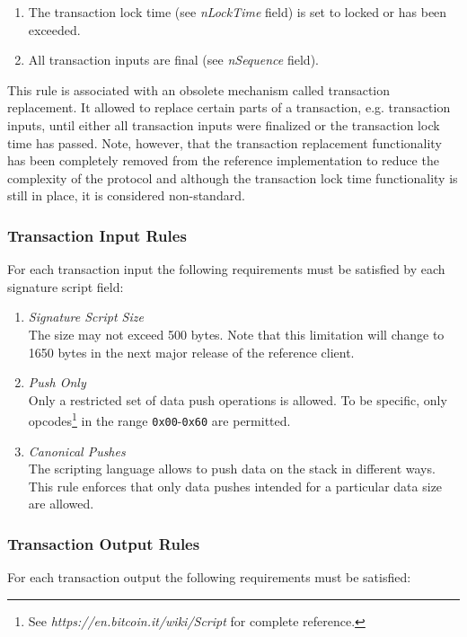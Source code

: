 \begin{enumerate}[label=\arabic*), leftmargin=1cm]
\item The transaction lock time (see \textit{nLockTime} field) is set to locked or has been exceeded.
\item All transaction inputs are final (see \textit{nSequence} field).
\end{enumerate}

\noindent
This rule is associated with an obsolete mechanism called transaction replacement. It allowed to replace certain parts of a transaction, e.g. transaction inputs, until either all transaction inputs were finalized or the transaction lock time has passed. Note, however, that the transaction replacement functionality has been completely removed from the reference implementation to reduce the complexity of the protocol and although the transaction lock time functionality is still in place, it is considered non-standard.

\subsubsection*{Transaction Input Rules}
For each transaction input the following requirements must be satisfied by each signature script field:

\begin{enumerate}[label=\arabic*), leftmargin=1cm]
\item \textit{Signature Script Size}~\\The size may not exceed 500 bytes. Note that this limitation will change to 1650 bytes in the next major release of the reference client.
\item \textit{Push Only}~\\Only a restricted set of data push operations is allowed. To be specific, only opcodes\footnote{See \textit{https://en.bitcoin.it/wiki/Script} for complete reference.} in the range \texttt{0x00}-\texttt{0x60} are permitted.
\item \textit{Canonical Pushes}~\\The scripting language allows to push data on the stack in different ways. This rule enforces that only data pushes intended for a particular data size are allowed.
\end{enumerate}

\subsubsection*{Transaction Output Rules}
For each transaction output the following requirements must be satisfied:

